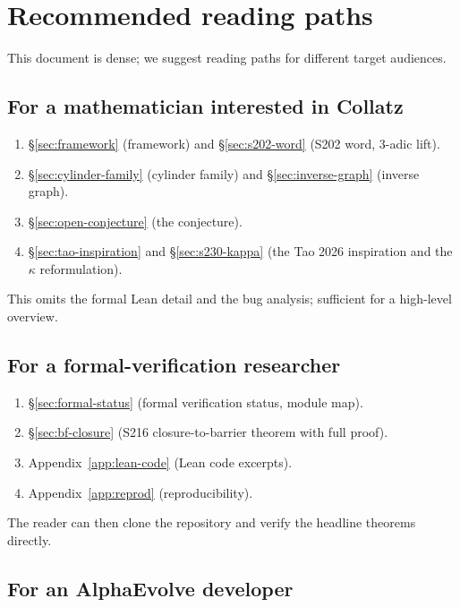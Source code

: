 \documentclass[11pt,a4paper]{article}
\theoremstyle{plain}
\theoremstyle{definition}
\begin{document}
\section{Recommended reading paths}\label{app:reading-paths}

This document is dense; we suggest reading paths for different
target audiences.

\subsection*{For a mathematician interested in Collatz}

\begin{enumerate}
   \item \S\ref{sec:framework} (framework) and
         \S\ref{sec:s202-word} (S202 word, 3-adic lift).
   \item \S\ref{sec:cylinder-family} (cylinder family) and
         \S\ref{sec:inverse-graph} (inverse graph).
   \item \S\ref{sec:open-conjecture} (the conjecture).
   \item \S\ref{sec:tao-inspiration} and \S\ref{sec:s230-kappa}
         (the Tao 2026 inspiration and the $\kappa$ reformulation).
\end{enumerate}
This omits the formal Lean detail and the bug analysis; sufficient
for a high-level overview.

\subsection*{For a formal-verification researcher}

\begin{enumerate}
   \item \S\ref{sec:formal-status} (formal verification status,
         module map).
   \item \S\ref{sec:bf-closure} (S216 closure-to-barrier theorem
         with full proof).
   \item Appendix~\ref{app:lean-code} (Lean code excerpts).
   \item Appendix~\ref{app:reprod} (reproducibility).
\end{enumerate}
The reader can then clone the repository and verify the headline
theorems directly.

\subsection*{For an AlphaEvolve developer}
\end{document}
